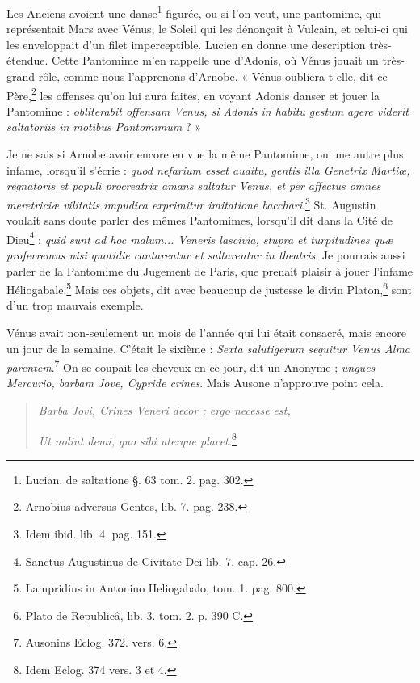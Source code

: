 \documentclass[a4paper, 18pt, oneside]{article}
\begin{document}
Les Anciens avoient une danse\footnote{Lucian. de saltatione §. 63 tom. 2. pag. 302.} figurée, ou si l'on veut, une pantomime, qui représentait Mars avec Vénus, le Soleil qui les dénonçait à Vulcain, et celui-ci qui les enveloppait d'un filet imperceptible. Lucien en donne une description très-étendue. Cette Pantomime m'en rappelle une d'Adonis, où Vénus jouait un très-grand rôle, comme nous l'apprenons d'Arnobe. « Vénus oubliera-t-elle, dit ce Père,\footnote{Arnobius adversus Gentes, lib. 7. pag. 238.} les offenses qu'on lui aura faites, en voyant Adonis danser et jouer la Pantomime : \emph{obliterabit offensam Venus, si Adonis in habitu gestum agere viderit saltatoriis in motibus Pantomimum} ? »

Je ne sais si Arnobe avoir encore en vue la même Pantomime, ou une autre plus infame, lorsqu'il s'écrie : \emph{quod nefarium esset auditu, gentis illa Genetrix Martiœ, regnatoris et populi procreatrix amans saltatur Venus, et per affectus omnes meretriciæ vilitatis impudica exprimitur imitatione bacchari}.\footnote{Idem ibid. lib. 4. pag. 151.} St. Augustin voulait sans doute parler des mêmes Pantomimes, lorsqu'il dit dans la Cité de Dieu\footnote{Sanctus Augustinus de Civitate Dei lib. 7. cap. 26.} : \emph{quid sunt ad hoc malum... Veneris lascivia, stupra et turpitudines quæ proferremus nisi quotidie cantarentur et saltarentur in theatris}. Je pourrais aussi parler de la Pantomime du Jugement de Paris, que prenait plaisir à jouer l'infame Héliogabale.\footnote{Lampridius in Antonino Heliogabalo, tom. 1. pag. 800.} Mais ces objets, dit avec beaucoup de justesse le divin Platon,\footnote{Plato de Republicâ, lib. 3. tom. 2. p. 390 C.} sont d'un trop mauvais exemple.

Vénus avait non-seulement un mois de l'année qui lui était consacré, mais encore un jour de la semaine. C'était le sixième : \emph{Sexta salutigerum sequitur Venus Alma parentem}.\footnote{Ausonins Eclog. 372. vers. 6.} On se coupait les cheveux en ce jour, dit un Anonyme ; \emph{ungues Mercurio, barbam Jove, Cypride crines}. Mais Ausone n'approuve point cela.
\begin{quotation}
\emph{Barba Jovi, Crines Veneri decor : ergo necesse est,}

\emph{Ut nolint demi, quo sibi uterque placet.}\footnote{Idem Eclog. 374 vers. 3 et 4.}
\end{quotation}
\end{document}
